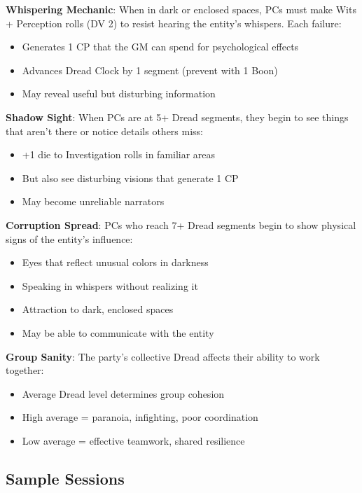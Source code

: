 \documentclass[11pt]{article}
\begin{document}
\begin{mdframed}[backgroundcolor=sanitybg]
\textbf{Whispering Mechanic}: When in dark or enclosed spaces, PCs must make Wits + Perception rolls (DV 2) to resist hearing the entity's whispers. Each failure:
\begin{itemize}[leftmargin=*]
\item Generates 1 CP that the GM can spend for psychological effects
\item Advances Dread Clock by 1 segment (prevent with 1 Boon)
\item May reveal useful but disturbing information
\end{itemize}

\textbf{Shadow Sight}: When PCs are at 5+ Dread segments, they begin to see things that aren't there or notice details others miss:
\begin{itemize}[leftmargin=*]
\item +1 die to Investigation rolls in familiar areas
\item But also see disturbing visions that generate 1 CP
\item May become unreliable narrators
\end{itemize}

\textbf{Corruption Spread}: PCs who reach 7+ Dread segments begin to show physical signs of the entity's influence:
\begin{itemize}[leftmargin=*]
\item Eyes that reflect unusual colors in darkness
\item Speaking in whispers without realizing it
\item Attraction to dark, enclosed spaces
\item May be able to communicate with the entity
\end{itemize}

\textbf{Group Sanity}: The party's collective Dread affects their ability to work together:
\begin{itemize}[leftmargin=*]
\item Average Dread level determines group cohesion
\item High average = paranoia, infighting, poor coordination
\item Low average = effective teamwork, shared resilience
\end{itemize}
\end{mdframed}

\subsection*{Sample Sessions}
\end{document}
